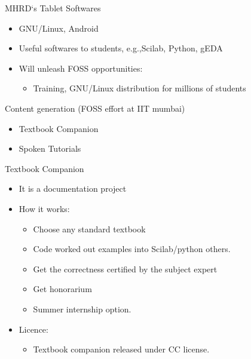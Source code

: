 \documentclass{beamer}
\begin{document}
   \begin{frame}{MHRD`s Tablet Softwares}

       \begin{itemize}[<+->]

          \item GNU/Linux, Android
          \item Useful softwares to students, e.g.,Scilab, Python, gEDA
          \item Will unleash FOSS opportunities:
                      \begin{itemize}
                              \item Training, GNU/Linux distribution for millions of students
                     \end{itemize}

    \end{itemize}
    \end{frame}                                

   \begin{frame}{Content generation (FOSS effort at IIT mumbai)}

        \begin{itemize}[<+->]

          \item Textbook Companion
           \item Spoken Tutorials

        \end{itemize}
   \end{frame}

   \begin{frame} {Textbook Companion}
         \begin{itemize}[<+->]

                \item It is a documentation project
                \item How it works: 
                        \begin{itemize}
                           \item Choose any standard textbook
                            \item Code worked out examples into Scilab/python others.
                             \item Get the correctness certified by the subject expert
                            \item Get honorarium 
                            \item Summer internship option.
                         \end{itemize}
                \item Licence:
                           \begin{itemize}
                                \item Textbook companion released under CC license.
                            \end{itemize}

          \end{itemize}
   \end{frame}
\end{document}
